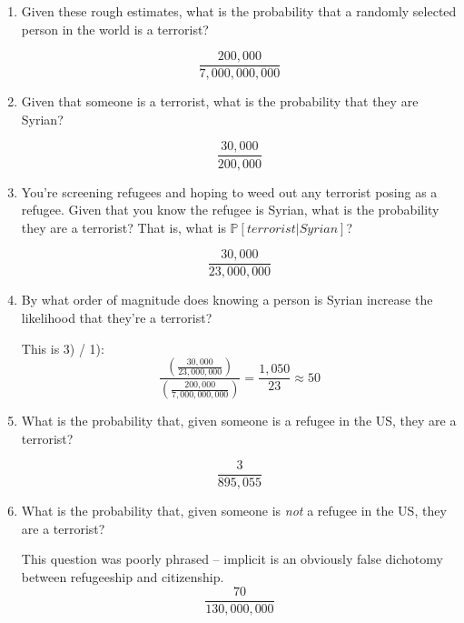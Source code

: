 \documentclass{article}
\newenvironment{solution}{\color{red}}{\color{black}}
\begin{document}
\begin{enumerate}
\item Given these rough estimates, what is the probability that a randomly selected person in the world is a terrorist?

\begin{solution}
$$ \frac{200,000}{7,000,000,000} $$
\end{solution}

\item Given that someone is a terrorist, what is the probability that they are Syrian?

\begin{solution}
$$ \frac{30,000}{200,000} $$
\end{solution}

\item You're screening refugees and hoping to weed out any terrorist posing as a refugee. Given that you know the refugee is Syrian, what is the probability they are a terrorist? That is, what is $\mathbb{P}[terrorist|Syrian]$?

\begin{solution}
$$ \frac{30,000}{23,000,000} $$
\end{solution}

\item By what order of magnitude does knowing a person is Syrian increase the likelihood that they're a terrorist?

\begin{solution}
This is 3) / 1):
$$ \frac{\left( \frac{30,000}{23,000,000} \right)}{\left( \frac{200,000}{7,000,000,000} \right)} = \frac{1,050}{23} \approx 50 $$
\end{solution}

\item What is the probability that, given someone is a refugee in the US, they are a terrorist?

\begin{solution}
$$\frac{3}{895,055}$$
\end{solution}

\item What is the probability that, given someone is \textit{not} a refugee in the US, they are a terrorist?

\begin{solution}
This question was poorly phrased -- implicit is an obviously false dichotomy between refugeeship and citizenship.
$$ \frac{70}{130,000,000} $$
\end{solution}


\end{enumerate}
\end{document}
